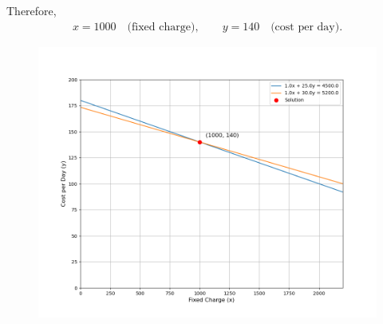\documentclass[article]{IEEEtran}
\begin{document}
Therefore,
\begin{align}
	x = 1000 \quad \text{(fixed charge)}, \qquad y = 140 \quad \text{(cost per day)}.
\end{align}

\begin{figure}[H]
	\centering
	\includegraphics[width=1.1\linewidth]{figs/hostel_charges_plot}
\end{figure}

	
\end{document}
